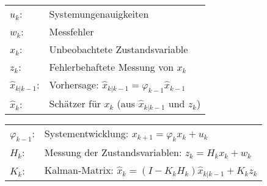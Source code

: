 	\begin{minipage}{8cm}
		\begin{tabular}{ll}
			$u_k$: & Systemungenauigkeiten \\
			$w_k$: & Messfehler \\
			$x_k$: & Unbeobachtete Zustandsvariable \\
			$z_k$: & Fehlerbehaftete Messung von $x_k$ \\
			$\hat{x}_{k|k-1}$: & Vorhersage: $\hat{x}_{k|k-1} = \varphi_{k-1} \hat{x}_{k-1}$\\
			$\hat{x}_k$: & Schätzer für $x_k$ (aus $\hat{x}_{k|k-1}$ und $z_k$)\\
		\end{tabular}
	\end{minipage}
	\begin{minipage}{8cm}
		\begin{tabular}{ll}
			$\varphi_{k-1}$: & Systementwicklung: $x_{k+1}=\varphi_k x_k + u_k$ \\
			$H_k$: & Messung der Zustandsvariablen: $z_k = H_k x_k + w_k$ \\
			$K_k$: & Kalman-Matrix: $\hat{x}_k = (I-K_k H_k)\hat{x}_{k|k-1} + K_k z_k$ \\
		\end{tabular}
	\end{minipage}
	
